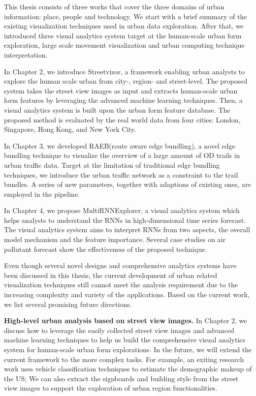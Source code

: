 This thesis consists of three works that cover the three domains of urban information: place, people and technology. We start with a brief summary of the existing visualization techniques used in urban data exploration. After that, we introduced three visual analytics system target at the human-scale urban form exploration, large scale movement visualization and urban computing technique interpretation.

In Chapter 2, we introduce Streetvizor, a framework enabling urban analysts to explore the human scale urban from city-, region- and street-level. The proposed system takes the street view images as input and extracts human-scale urban form features by leveraging the advanced machine learning techniques. Then, a visual analytics system is built upon the urban form feature database. The proposed method is evaluated by the real world data from four cities: London, Singapore, Hong Kong, and New York City. 

In Chapter 3, we developed RAEB(route aware edge bundling), a novel edge bundling technique to visualize the overview of a large amount of OD trails in urban traffic data. Target at the limitation of traditional edge bundling techniques, we introduce the urban traffic network as a constraint to the trail bundles. A series of new parameters, together with adaptions of existing ones, are employed in the pipeline.

In Chapter 4, we propose MultiRNNExplorer, a visual analytics system which helps analysts to understand the RNNs in high-dimensional time series forecast. The visual analytics system aims to interpret RNNs from two aspects, the overall model mechanism and the feature importance. Several case studies on air pollutant forecast show the effectiveness of the proposed technique.

Even though several novel designs and comprehensive analytics systems have been discussed in this thesis, the current development of urban related visualization techniques still cannot meet the analysis requirement due to the increasing complexity and variety of the applications. Based on the current work, we list several promising future directions.

\textbf{High-level urban analysis based on street view images.} In Chapter 2, we discuss how to leverage the easily collected street view images and advanced machine learning techniques to help us build the comprehensive visual analytics system for human-scale urban form explorations. In the future, we will extend the current framework to the more complex tasks. For example, an exiting research work uses vehicle classification techniques to estimate the demographic makeup of the US; We can also extract the signboards and building style from the street view images to support the exploration of urban region  functionalities.  

